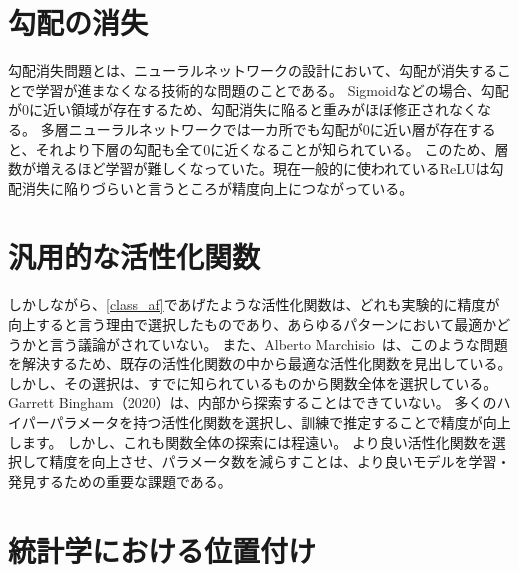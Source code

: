 \section{勾配の消失}
勾配消失問題とは、ニューラルネットワークの設計において、勾配が消失することで学習が進まなくなる技術的な問題のことである。
Sigmoidなどの場合、勾配が0に近い領域が存在するため、勾配消失に陥ると重みがほぼ修正されなくなる。
多層ニューラルネットワークでは一カ所でも勾配が0に近い層が存在すると、それより下層の勾配も全て0に近くなることが知られている。
このため、層数が増えるほど学習が難しくなっていた。現在一般的に使われているReLUは勾配消失に陥りづらいと言うところが精度向上につながっている。



\section{汎用的な活性化関数}

しかしながら、\ref{class_af}であげたような活性化関数は、どれも実験的に精度が向上すると言う理由で選択したものであり、あらゆるパターンにおいて最適かどうかと言う議論がされていない。
また、Alberto Marchisio~\cite{automatic_af}は、このような問題を解決するため、既存の活性化関数の中から最適な活性化関数を見出している。
しかし、その選択は、すでに知られているものから関数全体を選択している。Garrett Bingham（2020）は、内部から探索することはできていない。
多くのハイパーパラメータを持つ活性化関数を選択し、訓練で推定することで精度が向上します。 しかし、これも関数全体の探索には程遠い。
より良い活性化関数を選択して精度を向上させ、パラメータ数を減らすことは、より良いモデルを学習・発見するための重要な課題である。




\section{統計学における位置付け}

